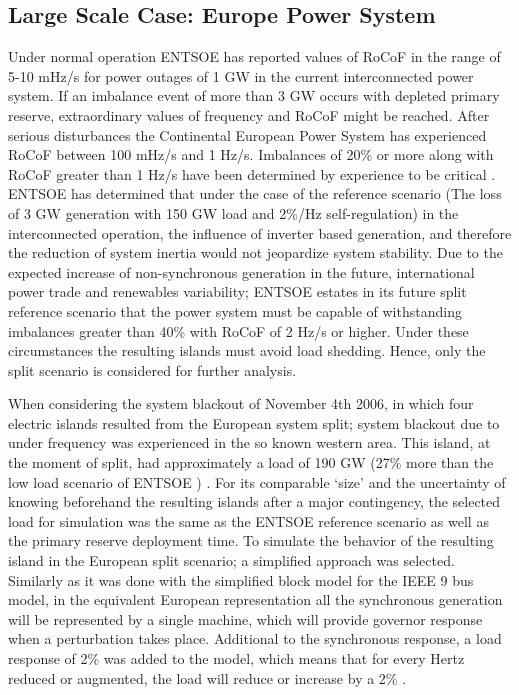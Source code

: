 \subsection{Large Scale Case: Europe Power System}

Under normal operation ENTSOE has reported values of RoCoF in the range of 5-10 mHz/s for power outages of 1 GW in the current interconnected power system. If an imbalance event of more than 3 GW occurs with depleted primary reserve, extraordinary values of frequency and RoCoF might be reached. After serious disturbances the Continental European Power System has experienced RoCoF between 100 mHz/s and 1 Hz/s. Imbalances of 20\% or more along with RoCoF greater than 1 Hz/s have been determined by experience to be critical \cite{ENTSOE.2016}.
ENTSOE has determined that under the case of the reference scenario (The loss of 3 GW generation with 150 GW load and 2\%/Hz self-regulation) in the interconnected operation, the influence of inverter based generation, and therefore the reduction of system inertia would not jeopardize system stability. Due to the expected increase of non-synchronous generation in the future, international power trade and renewables variability; ENTSOE estates in its future split reference scenario that the power system must be capable of withstanding imbalances greater than 40\% with RoCoF of 2 Hz/s or higher. Under these circumstances the resulting islands must avoid load shedding. Hence, only the split scenario is considered for further analysis.

When considering the system blackout of November 4th 2006, in which four electric islands resulted from the European system split; system blackout due to under frequency was experienced in the so known western area. This island, at the moment of split, had approximately a load of 190 GW (27\% more than the low load scenario of ENTSOE ) \cite{ucte2007final}. For its comparable `size’ and the uncertainty of knowing beforehand the resulting islands after a major contingency, the selected load for simulation was the same as the ENTSOE reference scenario as well as the primary reserve deployment time. To simulate the behavior of the resulting island in the European split scenario; a simplified approach was selected. Similarly as it was done with the simplified block model for the IEEE 9 bus model, in the equivalent European representation all the synchronous generation will be represented by a single machine, which will provide governor response when a perturbation takes place. Additional to the synchronous response, a load response of 2\% was added to the model, which means that for every Hertz reduced or augmented, the load will reduce or increase by a 2\% \cite{ENTSOE.2016}. \\

